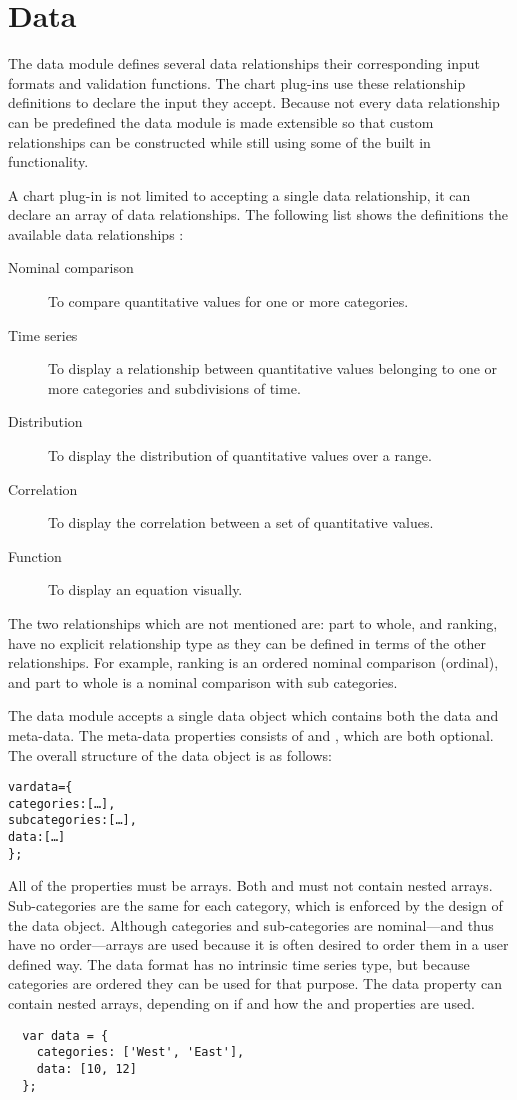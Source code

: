 \section{Data}
The data module defines several data relationships their corresponding input formats and validation functions. The chart plug-ins use these relationship definitions to declare the input they accept. Because not every data relationship can be predefined the data module is made extensible so that custom relationships can be constructed while still using some of the built in functionality.

A chart plug-in is not limited to accepting a single data relationship, it can declare an array of data relationships. The following list shows the definitions the available data relationships \cite{few06}:

\begin{description}
\item[Nominal comparison] To compare quantitative values for one or more categories.
\item[Time series] To display a relationship between quantitative values belonging to one or more categories and subdivisions of time.
\item[Distribution] To display the distribution of quantitative values over a range.
\item[Correlation] To display the correlation between a set of quantitative values.
\item[Function] To display an equation visually.
\end{description}

The two relationships which are not mentioned are: part to whole, and ranking, have no explicit relationship type as they can be defined in terms of the other relationships. For example, ranking is an ordered nominal comparison (ordinal), and part to whole is a nominal comparison with sub categories.

The data module accepts a single data object which contains both the data and meta-data. The meta-data properties consists of  and , which are both optional. The overall structure of the data object is as follows:
\begin{alltt}
  var data = \{
    categories: [\ldots],
    subcategories: [\ldots],
    data: [\ldots]
  \};
\end{alltt}

All of the properties must be arrays. Both  and  must not contain nested arrays. Sub-categories are the same for each category, which is enforced by the design of the data object. Although categories and sub-categories are nominal---and thus have no order---arrays are used because it is often desired to order them in a user defined way. The data format has no intrinsic time series type, but because categories are ordered they can be used for that purpose. The data property can contain nested arrays, depending on if and how the  and  properties are used.
\begin{verbatim}
  var data = {
    categories: ['West', 'East'],
    data: [10, 12]
  };
\end{verbatim}

